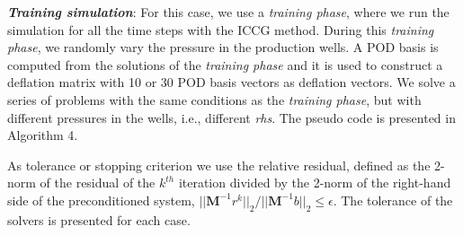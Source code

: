 \documentclass[12pt]{article}
\begin{document}
\textbf{\emph{Training simulation}}: For this case, we use a \emph{training phase}, where we run the simulation for all the time 
steps with the ICCG method. During this \emph{training phase}, we randomly vary the pressure in the production wells. 
A POD basis is computed from the solutions of the \emph{training phase} and it is used to construct a deflation matrix with 
10 or 30 POD basis vectors as deflation vectors. We solve a series of problems with the same conditions as the 
\emph{training phase}, but with different pressures in the wells, i.e., different \emph{rhs}. The pseudo code is presented 
in Algorithm 4.  \par
As tolerance or stopping criterion we use the relative residual, defined as the 2-norm of the residual of the $k^{th}$ 
iteration divided by 
the 2-norm of the right-hand side of the preconditioned system, 
${||\mathbf{M}^{-1}r^k||_2}\slash {||\mathbf{M}^{-1}b||_2}\leq \epsilon.$
The tolerance of the solvers is presented for each case.\par
\end{document}
